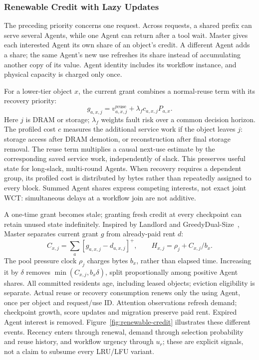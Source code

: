 \subsubsection{Renewable Credit with Lazy Updates}
\label{sec:renewable-credit}

The preceding priority concerns one request. Across requests, a shared
prefix can serve several Agents, while one Agent can return after a tool
wait. Master gives each interested Agent its own share of an object's
credit. A different Agent adds a share; the same Agent's new use refreshes
its share instead of accumulating another copy of its value. Agent
identity includes its workflow instance, and physical capacity is charged
only once.

For a lower-tier object $x$, the current grant combines a normal-reuse
term with its recovery priority:
\begin{equation}
 g_{a,x,j}=v^{\mathrm{reuse}}_{a,x,j}
                +\lambda_f c_{a,x,j}P_{a,x}.
 \label{eq:credit-grant}
\end{equation}
Here $j$ is DRAM or storage; $\lambda_f$ weights fault risk over a common
decision horizon. The profiled cost $c$ measures the additional service
work if the object leaves $j$: storage access after DRAM demotion, or
reconstruction after final storage removal. The reuse term multiplies a causal next-use estimate by the corresponding
saved service work, independently
of slack. This preserves useful state for long-slack, multi-round Agents.
When recovery requires a dependent group, its profiled cost is distributed
by bytes rather than repeatedly assigned to every block. Summed Agent
shares express competing interests, not exact joint WCT: simultaneous
delays at a workflow join are not additive.

A one-time grant becomes stale; granting fresh credit at every checkpoint
can retain unused state indefinitely. Inspired by Landlord and
GreedyDual-Size~\cite{young2002landlord,cao1997greedydual}, Master separates
current grant $g$ from already-paid rent $d$:
\begin{equation}
 C_{x,j}=\sum_a[g_{a,x,j}-d_{a,x,j}]^+,
 \qquad H_{x,j}=\rho_j+C_{x,j}/b_x.
 \label{eq:rental-credit}
\end{equation}
The pool pressure clock $\rho_j$ charges bytes $b_x$, rather than elapsed
time. Increasing it by $\delta$ removes $\min(C_{x,j},b_x\delta)$, split
proportionally among positive Agent shares. All committed residents age,
including leased objects; eviction eligibility is separate. Actual reuse or recovery consumption renews only the using Agent,
once per object and request/use ID. Attention observations refresh demand;
checkpoint growth, score updates and migration preserve paid rent.
Expired Agent interest is removed. Figure~\ref{fig:renewable-credit}
illustrates these different events. Recency enters through renewal,
demand through selection probability and reuse history, and workflow
urgency through $u_r$; these are explicit signals, not a claim to subsume
every LRU/LFU variant.

